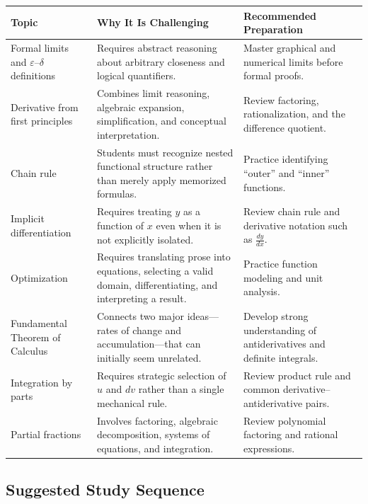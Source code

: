 \documentclass[11pt]{article}
\begin{document}
\begin{longtable}{p{} p{} p{}}
\toprule
\textbf{Topic} & \textbf{Why It Is Challenging} & \textbf{Recommended Preparation} \\
\midrule
\endhead

Formal limits and $\varepsilon$--$\delta$ definitions &
Requires abstract reasoning about arbitrary closeness and logical quantifiers. &
Master graphical and numerical limits before formal proofs. \\

Derivative from first principles &
Combines limit reasoning, algebraic expansion, simplification, and conceptual interpretation. &
Review factoring, rationalization, and the difference quotient. \\

Chain rule &
Students must recognize nested functional structure rather than merely apply memorized formulas. &
Practice identifying ``outer'' and ``inner'' functions. \\

Implicit differentiation &
Requires treating $y$ as a function of $x$ even when it is not explicitly isolated. &
Review chain rule and derivative notation such as $\frac{dy}{dx}$. \\

Optimization &
Requires translating prose into equations, selecting a valid domain, differentiating, and interpreting a result. &
Practice function modeling and unit analysis. \\

Fundamental Theorem of Calculus &
Connects two major ideas---rates of change and accumulation---that can initially seem unrelated. &
Develop strong understanding of antiderivatives and definite integrals. \\

Integration by parts &
Requires strategic selection of $u$ and $dv$ rather than a single mechanical rule. &
Review product rule and common derivative--antiderivative pairs. \\

Partial fractions &
Involves factoring, algebraic decomposition, systems of equations, and integration. &
Review polynomial factoring and rational expressions. \\
\bottomrule
\end{longtable}

\subsection{Suggested Study Sequence}
\end{document}
